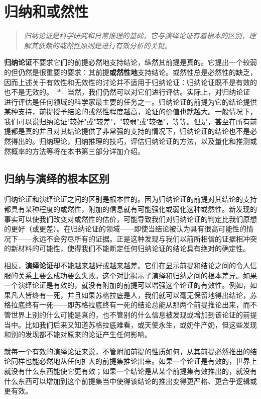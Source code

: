 \section{归纳和或然性}

\begin{quotation}
\textit{归纳论证是科学研究和日常推理的基础，它与演绎论证有着根本的区别，理解其依赖的或然性原则是进行有效分析的关键。}
\end{quotation}

\textbf{归纳论证}不要求它们的前提必然地支持结论，纵然其前提是真的。它提出一个较弱的但仍然是很重要的要求：其前提\textbf{或然性地}支持结论。或然性总是必然性的缺乏，因而上述关于有效性和无效性的讨论并不适用于归纳论证：归纳论证既不是有效的也不是无效的。$^{[46]}$ 当然，我们仍然可以对它们进行评估。实际上，对归纳论证进行评估是任何领域的科学家最主要的任务之一。归纳论证的前提为它的结论提供某种支持，前提授予结论的或然性程度越高，论证的价值也就越大。一般情况下，我们可以说归纳论证"较好"或"较差"，"较弱"或"较强"，等等。但是，甚至在所有前提都是真的并且对其结论提供了非常强的支持的情况下，归纳论证的结论也不是必然得出的。归纳理论，归纳推理的技巧，评估归纳论证的方法，以及量化和推测或然概率的方法等将在本书第三部分详加介绍。

\subsection{归纳与演绎的根本区别}

归纳论证和演绎论证之间的区别是根本性的。因为归纳论证的前提对其结论的支持都具有某种程度的或然性，附加的信息就有可能强化或弱化这种或然性。新发现的事实可以使我们改变对或然性的估价，可能导致我们对归纳论证的判定比我们原想的更好（或更差）。在归纳论证的领域——即使当结论被认为具有很高可能性的情况下——永远不会穷尽所有的证据。正是这种发现与我们以前所相信的证据相冲突的新材料的可能性，使得我们不能断定任何归纳论证的结论具有绝对的确定性。

相反，\textbf{演绎论证}却不能越来越好或越来越差。它们在显示前提和结论之间的令人信服的关系上要么成功要么失败。这个对比揭示了演绎和归纳之间的根本差异。如果一个演绎论证是有效的，就没有附加的前提可以增强这个论证的有效性。例如，如果凡人皆终有一死，并且如果苏格拉底是人，我们就可以毫无保留地得出结论，苏格拉底终有一死——即苏格拉底终有一死的结论总能从那两个前提推论出来，而不管世界上别的什么可能是真的，也不管别的什么信息被发现或增加到该论证的前提当中。比如我们后来又知道苏格拉底难看，或天使永生，或奶牛产奶，但这些发现和别的发现都不能对原来的论证产生任何影响。

就每一个有效的演绎论证来说，不管附加前提的性质如何，从其前提必然推出的结论同样也能必然地从任何扩大的前提集推论出来。如果一个论证是有效的，世界上就没有什么东西能使它更有效；如果一个结论是从某个前提集有效推出的，就没有什么东西可以增加到这个前提集当中使得该结论的推出变得更严格、更合乎逻辑或更有效。


